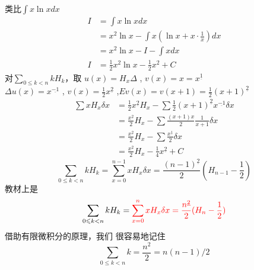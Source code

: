 \documentclass[mode=geye]{elegantnote}
\newcommand{\fallingfactorial}[1]{%
  ^{\underline{#1}}%
}
\begin{document}
类比$ \int x\ln{x} dx $ 
\begin{align*}
    I &= \int x\ln{x} dx \\
    &= x^2 \ln{x} - \int x(\ln{x}+x\cdot \frac{1}{x})dx\\
    &= x^2 \ln{x} - I - \int xdx\\
    I &= \frac{1}{2}x^2 \ln{x} - \frac{1}{2}x^2 + C
\end{align*}
对$ \sum_{0\leqslant k< n} k H_k $，取 $ u(x)=H_x \Delta $ , $ v(x)=x = x\fallingfactorial{1}$\\
$ \Delta u(x) = x\fallingfactorial{-1} $ , $ v(x) = \frac{1}{2}x\fallingfactorial{2} $ ,$ Ev(x) = v(x+1)=\frac{1}{2}(x+1)\fallingfactorial{2} $ 
\begin{align*}
    \sum x H_x \delta x
    &= \frac{1}{2}x\fallingfactorial{2}H_x - \sum \frac{1}{2}(x+1)\fallingfactorial{2}x\fallingfactorial{-1} \delta x\\
    &= \frac{x\fallingfactorial{2}}{2}H_x - \sum \frac{(x+1)x}{2} \frac{1}{x+1} \delta x\\
    &= \frac{x\fallingfactorial{2}}{2}H_x - \sum \frac{x\fallingfactorial{1}}{2}\delta x\\
    &= \frac{x\fallingfactorial{2}}{2}H_x - \frac{1}{4}x\fallingfactorial{2}+C
\end{align*}
\begin{equation*}
    \sum_{0\leqslant k< n} k H_k 
    = \sum_{x=0}^{n-1}x H_x \delta x = \frac{(n-1)\fallingfactorial{2}}{2}(H_{n-1}-\frac{1}{2})
\end{equation*}
教材上是
\begin{equation*}
    \sum_{0\leqslant k< n} k H_k 
    = {\color{red}\sum_{x=0}^{n}x H_x \delta x = \frac{n\fallingfactorial{2}}{2}(H_{n}-\frac{1}{2})}
\end{equation*}
{\color{blue}借助有限微积分的原理，我们
很容易地记住}
\begin{equation}
    \sum_{0\leqslant k<n}k = \frac{n^2}{2} = n(n-1)/2
\end{equation}
\end{document}
